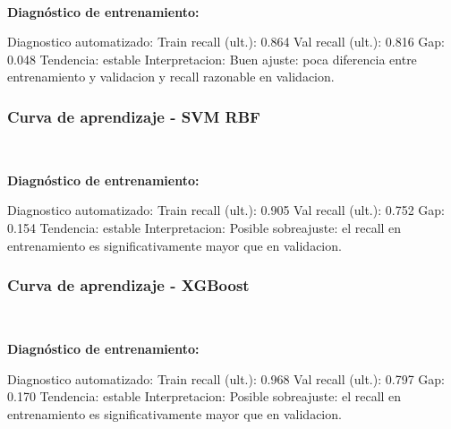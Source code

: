 \documentclass[11pt]{article}
\begin{document}
    
    \begin{center}
    \end{center}
    { \hspace*{\fill} \\}
    
    \textbf{Diagnóstico de entrenamiento:}

Diagnostico automatizado: Train recall (ult.): 0.864 \textbar{} Val
recall (ult.): 0.816 \textbar{} Gap: 0.048 \textbar{} Tendencia: estable
Interpretacion: Buen ajuste: poca diferencia entre entrenamiento y
validacion y recall razonable en validacion.

    
    \subsubsection{Curva de aprendizaje - SVM
RBF}\label{curva-de-aprendizaje---svm-rbf}

    
    \begin{center}
    \end{center}
    { \hspace*{\fill} \\}
    
    \textbf{Diagnóstico de entrenamiento:}

Diagnostico automatizado: Train recall (ult.): 0.905 \textbar{} Val
recall (ult.): 0.752 \textbar{} Gap: 0.154 \textbar{} Tendencia: estable
Interpretacion: Posible sobreajuste: el recall en entrenamiento es
significativamente mayor que en validacion.

    
    \subsubsection{Curva de aprendizaje -
XGBoost}\label{curva-de-aprendizaje---xgboost}

    
    \begin{center}
    \end{center}
    { \hspace*{\fill} \\}
    
    \textbf{Diagnóstico de entrenamiento:}

Diagnostico automatizado: Train recall (ult.): 0.968 \textbar{} Val
recall (ult.): 0.797 \textbar{} Gap: 0.170 \textbar{} Tendencia: estable
Interpretacion: Posible sobreajuste: el recall en entrenamiento es
significativamente mayor que en validacion.
\end{document}
